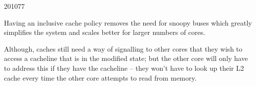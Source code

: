 \documentclass[10pt,\jkfside,a4paper]{article}
\begin{document}
\begin{examquestion}{2010}{7}{7}
\begin{enumerate}[label=(\alph*)]
Having an inclusive cache policy removes the need for snoopy buses which
greatly simplifies the system and scales better for larger numbers of cores.

Although, caches still need a way of signalling to other cores that they
wish to access a cacheline that is in the modified state; but the other core
will only have to address this if they have the cacheline -- they won't have
to look up their L2 cache every time the other core attempts to read from
memory.

\end{enumerate}

\end{examquestion}
\end{document}

